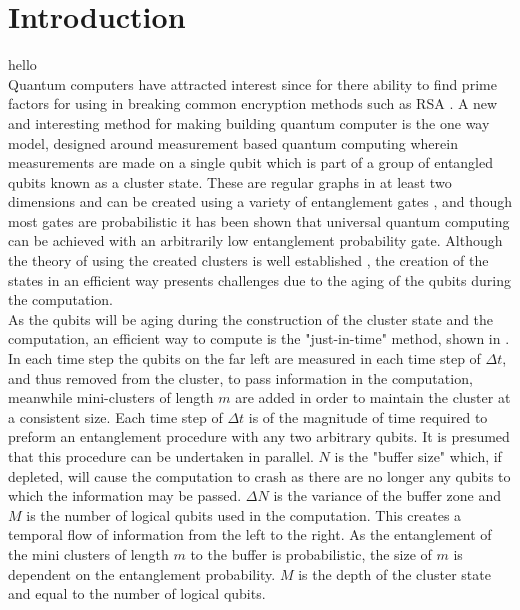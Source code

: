 \documentclass{article}
\numberwithin{equation}{section} %
\begin{document}
\section{Introduction} 

hello 
\\

Quantum computers have attracted interest since \cite{one} for there ability to find prime factors \cite{one} for using in breaking common encryption methods such as RSA \cite{one}. A new and interesting method for making building quantum computer is the one way model, designed around measurement based quantum computing \cite{one} wherein measurements are made on a single qubit which is part of a group of entangled qubits known as a cluster state. These are regular graphs in at least two dimensions and can be created using a variety of entanglement gates \cite{one}, and though most gates are probabilistic  it has been shown that universal quantum computing can be achieved with an arbitrarily low entanglement probability gate. Although the theory of using the created clusters is well established \cite{one}, the creation of the states in an efficient way presents challenges due to the aging of the qubits during the computation. \\





 As the qubits will be aging during the construction of the cluster state and the computation, an efficient way to compute is the "just-in-time" method, shown in \cite{justintime} . In each time step the qubits on the far left are measured in each time step of $\Delta t$, and thus removed from the cluster, to pass information in the computation, meanwhile mini-clusters of length $m$ are added in order to maintain the cluster at a consistent size. Each time step of $\Delta t$ is of the magnitude of time required to preform an entanglement procedure with any two arbitrary qubits. It is presumed that this procedure can be undertaken in parallel. $N$ is the "buffer size" which, if depleted, will cause the computation to crash as there are no longer any qubits to which the information may be passed. $\Delta N$ is the variance of the buffer zone and $M$ is the number of logical qubits used in the computation. This creates a temporal flow of information from the left to the right. As the entanglement of the mini clusters of length $m$ to the buffer is probabilistic, the size of $m$ is dependent on the entanglement probability. $M$ is the depth of the cluster state and equal to the number of logical qubits. \\
 
\end{document}
